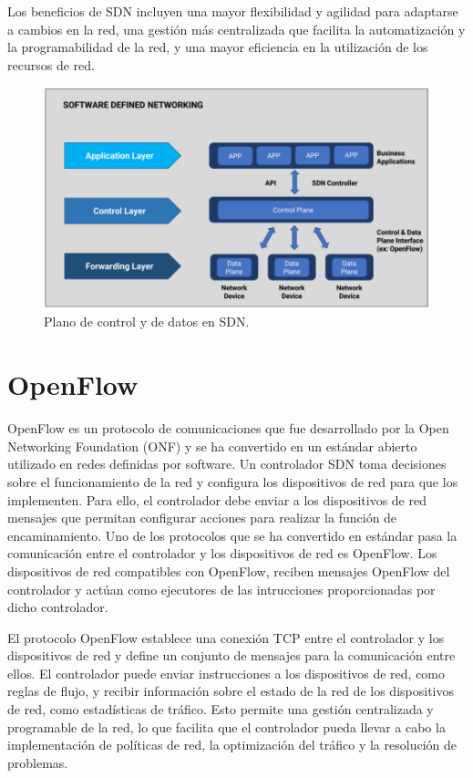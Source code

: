 \documentclass[a4paper, 12pt]{book}
\begin{document}
	Los beneficios de SDN incluyen una mayor flexibilidad y agilidad para adaptarse a cambios en la red, una gestión más centralizada que facilita la automatización y la programabilidad de la red, y una mayor eficiencia en la utilización de los recursos de red.
	
	
	\begin{figure}[H]
		\centering
		\includegraphics[width=14cm, keepaspectratio]{img/SDN}
		\caption{Plano de control y de datos en SDN.}
		\label{figura:SDN}
	\end{figure}
	
	\section{OpenFlow}
	\label{sec:openflow}
	
	
	OpenFlow es un protocolo de comunicaciones que fue desarrollado por la Open Networking Foundation (ONF) y se ha convertido en un estándar abierto utilizado en redes definidas por software.
	Un controlador SDN toma decisiones sobre el funcionamiento de la red y configura los dispositivos de red para que los implementen. Para ello, el controlador debe enviar a los dispositivos de red mensajes que permitan configurar acciones para realizar la función de encaminamiento. Uno de los protocolos que se ha convertido en estándar pasa la comunicación entre el controlador y los dispositivos de red es OpenFlow. Los dispositivos de red compatibles con OpenFlow, reciben mensajes  OpenFlow del controlador y actúan como ejecutores de las intrucciones proporcionadas por dicho controlador.
	
	El protocolo OpenFlow establece una conexión TCP entre el controlador y los dispositivos de red  y define un conjunto de mensajes para la comunicación entre ellos. El controlador puede enviar instrucciones a los dispositivos de red, como reglas de flujo, y recibir información sobre el estado de la red de los dispositivos de red, como estadísticas de tráfico. Esto permite una gestión centralizada y programable de la red, lo que facilita que el controlador pueda llevar a cabo la implementación de políticas de red, la optimización del tráfico y la resolución de problemas.
\end{document}
